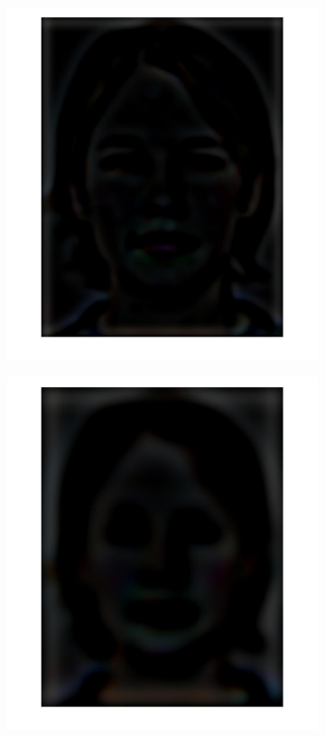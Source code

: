 \documentclass[a4paper]{iacas}
\begin{document}
\begin{figure}[!htbp]
\begin{subfigure}[b]{0.15\textwidth}
		\caption{}
		\label{fig:403}
	\end{subfigure}
	\begin{subfigure}[b]{0.15\textwidth}
		\includegraphics[width=\textwidth]{404.jpg}
		\caption{}
		\label{fig:404}
	\end{subfigure}
	\begin{subfigure}[b]{0.15\textwidth}
		\includegraphics[width=\textwidth]{405.jpg}

\end{subfigure}
\end{figure}
\end{document}

